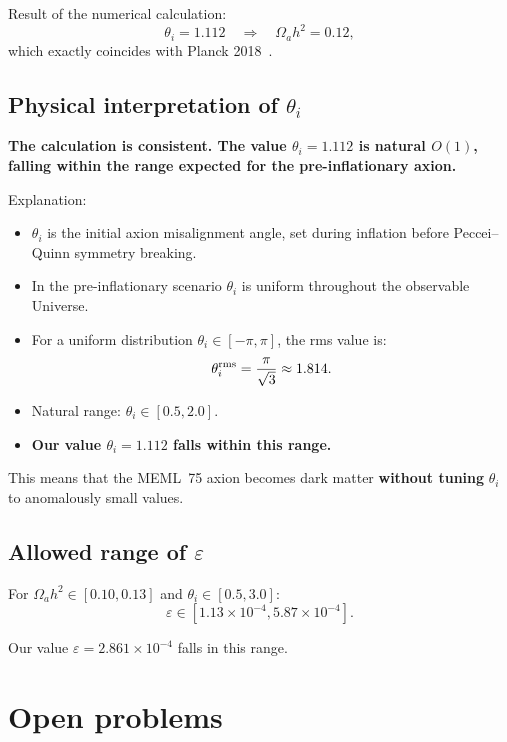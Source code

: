\documentclass[12pt,a4paper]{article}
\numberwithin{equation}{section}
\begin{document}
Result of the numerical calculation:
\begin{equation}
\theta_i = 1.112 \quad \Rightarrow \quad \Omega_a h^2 = 0.12,
\end{equation}
which exactly coincides with Planck 2018~\cite{Planck2018}.

\subsection{Physical interpretation of $\theta_i$}

\textbf{The calculation is consistent. The value $\theta_i = 1.112$
is natural $O(1)$, falling within the range expected for the
pre-inflationary axion.}

Explanation:
\begin{itemize}[leftmargin=1.5em,itemsep=0.05em]
\item $\theta_i$ is the initial axion misalignment angle, set
during inflation before Peccei--Quinn symmetry breaking.
\item In the pre-inflationary scenario $\theta_i$ is uniform
throughout the observable Universe.
\item For a uniform distribution $\theta_i \in [-\pi, \pi]$,
the rms value is:
\begin{equation}
\theta_i^{\rm rms} = \frac{\pi}{\sqrt{3}} \approx 1.814.
\end{equation}
\item Natural range: $\theta_i \in [0.5, 2.0]$.
\item \textbf{Our value $\theta_i = 1.112$ falls within this range.}
\end{itemize}

This means that the MEML~75 axion becomes dark matter
\textbf{without tuning} $\theta_i$ to anomalously small values.

\subsection{Allowed range of $\varepsilon$}

For $\Omega_a h^2 \in [0.10, 0.13]$ and $\theta_i \in [0.5, 3.0]$:
\begin{equation}
\varepsilon \in [1.13\times 10^{-4}, 5.87\times 10^{-4}].
\end{equation}

Our value $\varepsilon = 2.861\times 10^{-4}$ falls in this range.

\section{Open problems}
\end{document}
